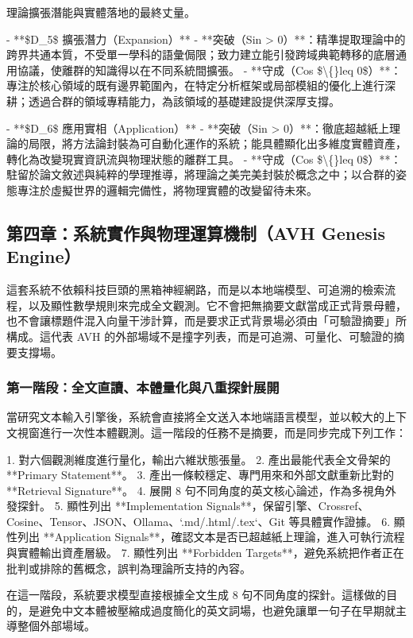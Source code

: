 \documentclass{article}
\begin{document}
理論擴張潛能與實體落地的最終丈量。

- **\$D\_5\$ 擴張潛力（Expansion）**
  - **突破（Sin > 0）**：精準提取理論中的跨界共通本質，不受單一學科的語彙侷限；致力建立能引發跨域典範轉移的底層通用協議，使離群的知識得以在不同系統間擴張。
  - **守成（Cos \$\textbackslash\{\}leq 0\$）**：專注於核心領域的既有邊界範圍內，在特定分析框架或局部模組的優化上進行深耕；透過合群的領域專精能力，為該領域的基礎建設提供深厚支撐。

- **\$D\_6\$ 應用實相（Application）**
  - **突破（Sin > 0）**：徹底超越紙上理論的局限，將方法論封裝為可自動化運作的系統；能具體顯化出多維度實體資產，轉化為改變現實資訊流與物理狀態的離群工具。
  - **守成（Cos \$\textbackslash\{\}leq 0\$）**：駐留於論文敘述與純粹的學理推導，將理論之美完美封裝於概念之中；以合群的姿態專注於虛擬世界的邏輯完備性，將物理實體的改變留待未來。

\subsection{第四章：系統實作與物理運算機制（AVH Genesis Engine）}

這套系統不依賴科技巨頭的黑箱神經網路，而是以本地端模型、可追溯的檢索流程，以及顯性數學規則來完成全文觀測。它不會把無摘要文獻當成正式背景母體，也不會讓標題件混入向量干涉計算，而是要求正式背景場必須由「可驗證摘要」所構成。這代表 AVH 的外部場域不是撞字列表，而是可追溯、可量化、可驗證的摘要支撐場。

\subsubsection{第一階段：全文直讀、本體量化與八重探針展開}

當研究文本輸入引擎後，系統會直接將全文送入本地端語言模型，並以較大的上下文視窗進行一次性本體觀測。這一階段的任務不是摘要，而是同步完成下列工作：

1. 對六個觀測維度進行量化，輸出六維狀態張量。  
2. 產出最能代表全文骨架的 **Primary Statement**。  
3. 產出一條較穩定、專門用來和外部文獻重新比對的 **Retrieval Signature**。  
4. 展開 8 句不同角度的英文核心論述，作為多視角外發探針。  
5. 顯性列出 **Implementation Signals**，保留引擎、Crossref、Cosine、Tensor、JSON、Ollama、`.md/.html/.tex`、Git 等具體實作證據。  
6. 顯性列出 **Application Signals**，確認文本是否已超越紙上理論，進入可執行流程與實體輸出資產層級。  
7. 顯性列出 **Forbidden Targets**，避免系統把作者正在批判或排除的舊概念，誤判為理論所支持的內容。  

在這一階段，系統要求模型直接根據全文生成 8 句不同角度的探針。這樣做的目的，是避免中文本體被壓縮成過度簡化的英文詞場，也避免讓單一句子在早期就主導整個外部場域。
\end{document}
